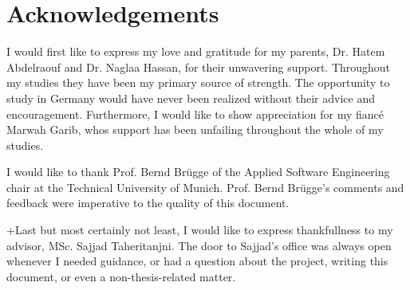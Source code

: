 \documentclass[a4paper,12pt,twoside]{report}
\begin{document}
\setlength{\evensidemargin}{22pt}
\setlength{\oddsidemargin}{22pt}

\def\doctype{Master's Thesis}
\def\faculty{Informatik}
\def\title{Using Synthetic Data for Classification of Small Parts}
\def\titleGer{Verwendung synthetischer Daten für die Kleinteil-Erkennung}
\def\supervisor{Prof. Bernd Brügge, Ph.D.}
\def\advisor{Sajjad Taheritanjni, M.Sc.}
\def\author{Amr Abdelraouf}
\def\date{15.10.2018}



\lstset{showspaces=false, numbers=left, frame=single, basicstyle=\small}




\newpage
\thispagestyle{empty}
\mbox{}


\newpage
\thispagestyle{empty}
\mbox{}

 \chapter*{Acknowledgements}
I would first like to express my love and gratitude for my parents, Dr. Hatem Abdelraouf and Dr. Naglaa Hassan, for their unwavering support. Throughout my studies they have been my primary source of strength. The opportunity to study in Germany would have never been realized without their advice and encouragement. Furthermore, I would like to show appreciation for my fiancé Marwah Garib, whos support has been unfailing throughout the whole of my studies.

I would like to thank Prof. Bernd Brügge of the Applied Software Engineering chair at the Technical University of Munich. Prof. Bernd Brügge's comments and feedback were imperative to the quality of this document.

+Last but most certainly not least, I would like to express thankfullness to my advisor, MSc. Sajjad Taheritanjni. The door to Sajjad's office was always open whenever I needed guidance, or had a question about the project, writing this document, or even a non-thesis-related matter.




\clearpage

\tableofcontents
\clearpage
\end{document}

